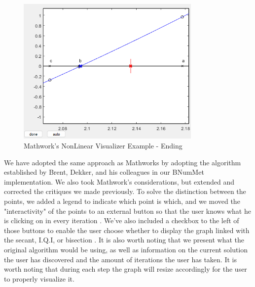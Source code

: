 \begin{figure}[H]
    \centering
    \includegraphics[width=0.8\textwidth]{Include/Images/Thesis/Development/Visualizers/NON LINEAR VISUALIZER/Mathworks.NonLinear.Ex1.1.png}
    \caption{Mathwork's NonLinear Visualizer Example - Ending}
    \label{fig:Mathwork's NonLinear Visualizer Example - Ending}
\end{figure}

We have adopted the same approach as Mathworks by adopting the algorithm established by Brent, Dekker, and his colleagues in our BNumMet implementation. We also took Mathwork's considerations, but extended and corrected the critiques we made previously. To solve the distinction between the points, we added a legend to indicate which point is which, and we moved the "interactivity" of the points to an external button so that the user knows what he is clicking on in every iteration . We've also included a checkbox to the left of those buttons to enable the user choose whether to display the graph linked with the secant, I.Q.I, or bisection . It is also worth noting that we present what the original algorithm would be using, as well as information on the current solution the user has discovered and the amount of iterations the user has taken. It is worth noting that during each step the graph will resize accordingly for the user to properly visualize it. 


